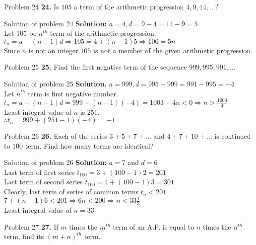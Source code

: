 \documentclass[aspectratio=1610,8pt]{beamer}
\begin{document}
\begin{frame}{Problem 24}
  \textbf{24.} Is $105$ a term of the arithmetic progression $4, 9, 14, \ldots ?$
\end{frame}
\begin{frame}{Solution of problem 24}
  \textbf{Solution:} $a = 4, d = 9 - 4 = 14 - 9 = 5$\\
  Let $105$ be $n^{th}$ term of the arithmetic progression.\\
  $t_n = a + (n - 1)d \Rightarrow 105 = 4 + (n - 1)5 \Rightarrow 106 = 5n$\\
  Since $n$ is not an integer $105$ is not a member of the given arithmetic progression.
\end{frame}
\begin{frame}{Problem 25}
  \textbf{25.} Find the first negative term of the sequence $999, 995, 991, \ldots$
\end{frame}
\begin{frame}{Solution of problem 25}
  \textbf{Solution.} $a = 999, d = 995 - 999 = 991 - 995 = -4$\\
  Let $n^{th}$ term is first negative number.\\
  $t_n = a + (n - 1)d = 999 + (n - 1)(-4) = 1003 - 4n < 0 \Rightarrow n >
  \frac{1003}{4}$\\
  Least integral value of $n$ is $251.$\\
  $\therefore t_n = 999 + (251 - 1)(-4) = -1$
\end{frame}
\begin{frame}{Problem 26}
  \textbf{26.} Each of the series $3 + 5 + 7 + \ldots$ and $4 + 7 + 10 +
  \ldots$ is continued to $100$ term. Find how many terms are identical?
\end{frame}
\begin{frame}{Solution of problem 26}
  \textbf{Solution:} $a = 7$ and $d = 6$\\
  Last term of first series $t_{100} = 3 + (100 - 1)2 = 201$\\
  Last term of second series $t_{100} = 4 + (100 - 1)3 = 301$\\
  Clearly, last term of series of common terms $t_n < 201$\\
  $7 + (n - 1)6 < 201 \Rightarrow 6n < 200 \Rightarrow n < 33\frac{1}{3}$\\
  Least integral value of $n = 33$
\end{frame}
\begin{frame}{Problem 27}
  \textbf{27.} If $m$ times the $m^{th}$ term of an A.P. is equal to $n$ times
  the $n^{th}$ term, find its $(m + n)^{th}$ term.
\end{frame}
\end{document}
